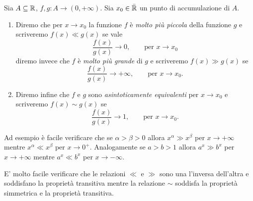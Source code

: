 \begin{definition}%
  \label{def:ordine_infinito}%
  \mymark{***}%
%
  Sia $A\subseteq {\mathbb R}$, $f,g\colon A \to (0,+\infty)$.
  Sia $x_0\in \bar {{\mathbb R}}$ un punto di accumulazione di $A$.
  \begin{enumerate}
  \item
  Diremo che
  per $x\to x_0$ la funzione $f$ è \emph{molto più piccola}
  della funzione $g$ e scriveremo $f(x) \ll g(x)$ se vale
  \mymargin{$\ll$}%
\index{$\ll$}
  \[
  \frac{f(x)}{g(x)} \to 0, \qquad \text{per $x\to x_0$}
  \]
  diremo invece che $f$ è \emph{molto più grande}
  di $g$ e scriveremo $f(x) \gg g(x)$ se
  \mymargin{$\gg$}%
\index{$\gg$}
  \[
  \frac{f(x)}{g(x)} \to +\infty, \qquad \text{per $x\to x_0$.}
  \]
  \item
  Diremo infine che $f$ e $g$
  sono \emph{asintoticamente equivalenti}%
%
%
  per $x\to x_0$
  e scriveremo $f(x) \sim g(x)$ se
  \mymargin{$\sim$}%
\index{$\sim$}
  \[
  \frac{f(x)}{g(x)} \to 1, \qquad \text{per $x\to x_0.$}
  \]
  \end{enumerate}
\end{definition}
  
Ad esempio è facile verificare che se $\alpha > \beta > 0$
allora $x^\alpha \gg x^\beta$ per $x\to +\infty$
mentre $x^\alpha \ll x^\beta$ per $x\to 0^+$.
Analogamente se $a>b>1$ allora $a^x\gg b^x$ per $x\to +\infty$
mentre $a^x \ll b^x$ per $x\to -\infty$.

E' molto facile verificare che le relazioni
$\ll$ e $\gg$ sono una l'inversa dell'altra
e soddisfano la proprietà transitiva
mentre la relazione $\sim$ soddisfa la proprietà simmetrica
e la proprietà transitiva.

